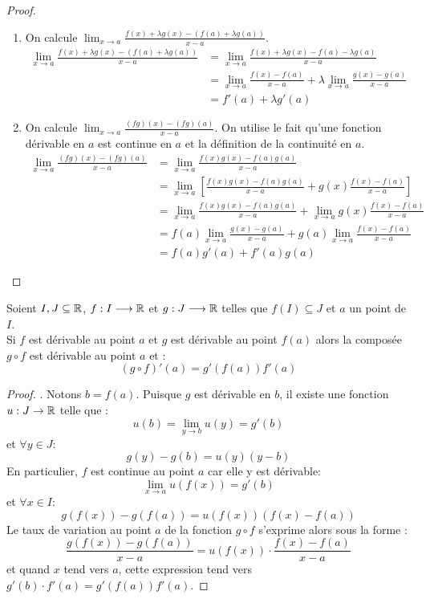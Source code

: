 \begin{proof}
	\leavevmode
	\begin{enumerate}
		\item On calcule $\lim_{x \to a} \frac{f(x) + \lambda g(x) - (f(a) + \lambda g(a))}{x - a}$.
		\begin{align*}
			\lim_{x \to a} \frac{f(x) + \lambda g(x) - (f(a) + \lambda g(a))}{x - a} &= \lim_{x \to a} \frac{f(x) + \lambda g(x) - f(a) - \lambda g(a)}{x - a} \\
			&= \lim_{x \to a} \frac{f(x) - f(a)}{x - a} + \lambda \lim_{x \to a} \frac{g(x) - g(a)}{x - a} \\
			&= f'(a) + \lambda g'(a)
		\end{align*}
		\item On calcule $\lim_{x \to a} \frac{(fg)(x) - (fg)(a)}{x - a}$. On utilise le fait qu'une fonction dérivable en $a$ est continue en $a$ et la définition de la continuité en $a$.
		\begin{align*}
			\lim_{x \to a} \frac{(fg)(x) - (fg)(a)}{x - a} &= \lim_{x \to a} \frac{f(x) g(x) - f(a) g(a)}{x - a} \\
			&= \lim_{x \to a} \left[ \frac{f(x) g(x) - f(a) g(a)}{x - a} + g(x) \frac{f(x) - f(a)}{x - a} \right] \\
			&= \lim_{x \to a} \frac{f(x)g(x) - f(a)g(a)}{x - a} + \lim_{x \to a} g(x) \frac{f(x) - f(a)}{x - a} \\
			&= f(a) \lim_{x \to a} \frac{g(x) - g(a)}{x - a} + g(a) \lim_{x \to a} \frac{f(x) - f(a)}{x - a} \\
			&= f(a) g'(a) + f'(a) g(a)
		\end{align*}
	\end{enumerate}
\end{proof}

\begin{theorem}
	Soient $I, J \subseteq \mathbb{R}$, $f : I \longrightarrow \mathbb{R}$ et $g : J \longrightarrow \mathbb{R}$ telles que $f(I) \subseteq J$ et $a$ un point de $I$. \\
	Si $f$ est dérivable au point $a$ et $g$ est dérivable au point $f(a)$ alors la composée $g \circ f$ est dérivable au point $a$ et :
	\[ (g \circ f)'(a) = g'(f(a)) f'(a) \]
\end{theorem}

\begin{proof}
	\cite{derivation_wikiversite}. Notons $b = f(a)$. Puisque $g$ est dérivable en $b$, il existe une fonction $u : J \to \mathbb{R}$ telle que :
	\[ u(b) = \lim_{y \to b} u(y) = g'(b) \]
	et $\forall y \in J :$ 
	\[ g(y) - g(b) = u(y) (y - b) \]
	En particulier, $f$ est continue au point $a$ car elle y est dérivable: 
	\[ \lim_{x \to a} u(f(x)) = g'(b) \]
	et $\forall x \in I :$
	\[ g(f(x)) - g(f(a)) = u(f(x)) (f(x) - f(a)) \]
	Le taux de variation au point $a$ de la fonction $g \circ f$ s'exprime alors sous la forme :
	\[ \frac{g(f(x)) - g(f(a))}{x - a} = u(f(x)) \cdot \frac{f(x) - f(a)}{x - a} \]
	et quand $x$ tend vers $a$, cette expression tend vers $g'(b) \cdot f'(a) = g'(f(a)) f'(a)$.
\end{proof}

